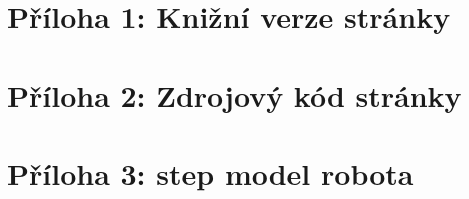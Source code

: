 \documentclass[a4paper, 12pt, twoside]{article}
\begin{document}
  \cleardoublepage

  \section{Příloha 1: Knižní verze stránky} \label{sec:Příloha 1: Knižní verze stránky}

  \newpage

  \section{Příloha 2: Zdrojový kód stránky} \label{sec:Příloha 2: Zdrojový kód stránky}

  \newpage

  \section{Příloha 3: \acrshort{step} model robota} \label{sec:STEP model robota}
\end{document}
